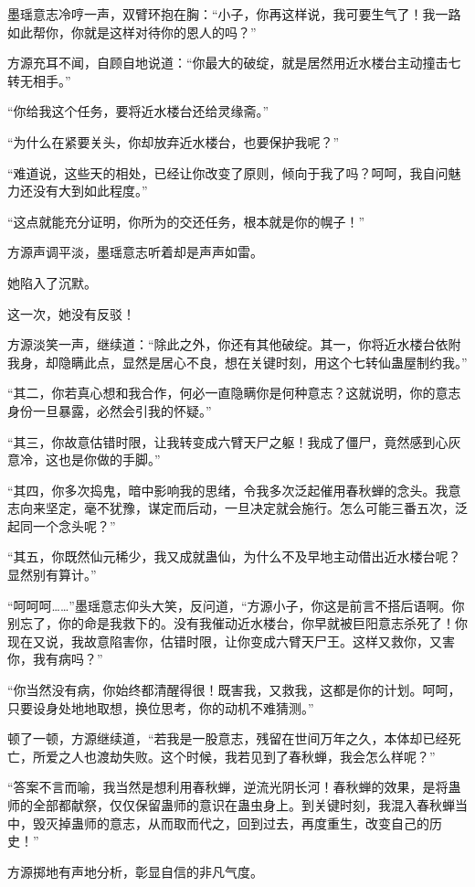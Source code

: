 \begin{this_body}
墨瑶意志冷哼一声，双臂环抱在胸：“小子，你再这样说，我可要生气了！我一路如此帮你，你就是这样对待你的恩人的吗？”

方源充耳不闻，自顾自地说道：“你最大的破绽，就是居然用近水楼台主动撞击七转无相手。”

“你给我这个任务，要将近水楼台还给灵缘斋。”

“为什么在紧要关头，你却放弃近水楼台，也要保护我呢？”

“难道说，这些天的相处，已经让你改变了原则，倾向于我了吗？呵呵，我自问魅力还没有大到如此程度。”

“这点就能充分证明，你所为的交还任务，根本就是你的幌子！”

方源声调平淡，墨瑶意志听着却是声声如雷。

她陷入了沉默。

这一次，她没有反驳！

方源淡笑一声，继续道：“除此之外，你还有其他破绽。其一，你将近水楼台依附我身，却隐瞒此点，显然是居心不良，想在关键时刻，用这个七转仙蛊屋制约我。”

“其二，你若真心想和我合作，何必一直隐瞒你是何种意志？这就说明，你的意志身份一旦暴露，必然会引我的怀疑。”

“其三，你故意估错时限，让我转变成六臂天尸之躯！我成了僵尸，竟然感到心灰意冷，这也是你做的手脚。”

“其四，你多次捣鬼，暗中影响我的思绪，令我多次泛起催用春秋蝉的念头。我意志向来坚定，毫不犹豫，谋定而后动，一旦决定就会施行。怎么可能三番五次，泛起同一个念头呢？”

“其五，你既然仙元稀少，我又成就蛊仙，为什么不及早地主动借出近水楼台呢？显然别有算计。”

“呵呵呵……”墨瑶意志仰头大笑，反问道，“方源小子，你这是前言不搭后语啊。你别忘了，你的命是我救下的。没有我催动近水楼台，你早就被巨阳意志杀死了！你现在又说，我故意陷害你，估错时限，让你变成六臂天尸王。这样又救你，又害你，我有病吗？”

“你当然没有病，你始终都清醒得很！既害我，又救我，这都是你的计划。呵呵，只要设身处地地取想，换位思考，你的动机不难猜测。”

顿了一顿，方源继续道，“若我是一股意志，残留在世间万年之久，本体却已经死亡，所爱之人也渡劫失败。这个时候，我若见到了春秋蝉，我会怎么样呢？”

“答案不言而喻，我当然是想利用春秋蝉，逆流光阴长河！春秋蝉的效果，是将蛊师的全部都献祭，仅仅保留蛊师的意识在蛊虫身上。到关键时刻，我混入春秋蝉当中，毁灭掉蛊师的意志，从而取而代之，回到过去，再度重生，改变自己的历史！”

方源掷地有声地分析，彰显自信的非凡气度。


\end{this_body}
